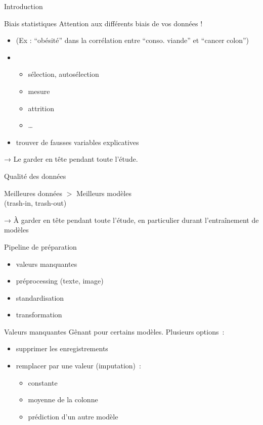 \begin{frame}{Introduction}
\end{frame}


\begin{frame}{Biais statistiques}
  Attention aux différents biais de vos données !
  \begin{itemize}[<+->]
  \item {} (Ex : ``obésité'' dans la corrélation entre ``conso. viande'' et ``cancer colon'')
  \item {}
    \begin{itemize}
    \item sélection, autosélection
    \item mesure
    \item attrition
    \item …
    \end{itemize}
  \item trouver de fausses variables explicatives
  \end{itemize}
  \pause
  → Le garder en tête pendant toute l'étude.
\end{frame}

\begin{frame}{Qualité des données}
  \begin{center}
    Meilleures données $>$ Meilleurs modèles \\
    (trash-in, trash-out) \\
  \end{center}
  → À garder en tête pendant toute l'étude, en particulier durant
  l'entraînement de modèles
\end{frame}

\begin{frame}{Pipeline de préparation}
  \begin{itemize}
  \item valeurs manquantes
  \item préprocessing (texte, image)
  \item standardisation
  \item transformation
  \end{itemize}
\end{frame}

\begin{frame}{Valeurs manquantes}
  Gênant pour certains modèles. Plusieurs options :
  \begin{itemize}[<+->]
  \item supprimer les enregistrements
  \item remplacer par une valeur (imputation) :
    \begin{itemize}[<+->]
    \item constante
    \item moyenne de la colonne
    \item prédiction d'un autre modèle
    \end{itemize}
  \end{itemize}
\end{frame}

